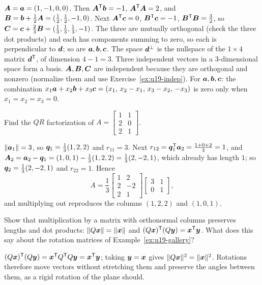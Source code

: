 \begin{solution}
$\boldsymbol{A}=\boldsymbol{a}=(1,-1,0,0)$. Then $\boldsymbol{A}^{\mathsf{T}}\boldsymbol{b}=-1$, $\boldsymbol{A}^{\mathsf{T}}\boldsymbol{A}=2$, and
$\boldsymbol{B}=\boldsymbol{b}+\frac12\boldsymbol{A}=(\frac12,\frac12,-1,0)$. Next $\boldsymbol{A}^{\mathsf{T}}\boldsymbol{c}=0$,
$\boldsymbol{B}^{\mathsf{T}}\boldsymbol{c}=-1$, $\boldsymbol{B}^{\mathsf{T}}\boldsymbol{B}=\frac32$, so
$\boldsymbol{C}=\boldsymbol{c}+\frac23\boldsymbol{B}=(\frac13,\frac13,\frac13,-1)$. The three are mutually orthogonal
(check the three dot products) and each has components summing to zero, so each is
perpendicular to $\boldsymbol{d}$; so are $\boldsymbol{a},\boldsymbol{b},\boldsymbol{c}$. The space $\boldsymbol{d}^{\perp}$ is the
nullspace of the $1\times 4$ matrix $\boldsymbol{d}^{\mathsf{T}}$, of dimension $4-1=3$. Three independent
vectors in a $3$-dimensional space form a basis. $\boldsymbol{A},\boldsymbol{B},\boldsymbol{C}$ are independent
because they are orthogonal and nonzero (normalize them and use Exercise~\ref{ex:u19-indep}).
For $\boldsymbol{a},\boldsymbol{b},\boldsymbol{c}$: the combination
$x_1\boldsymbol{a}+x_2\boldsymbol{b}+x_3\boldsymbol{c}=(x_1,\,x_2-x_1,\,x_3-x_2,\,-x_3)$ is zero only when
$x_1=x_2=x_3=0$.
\end{solution}

\begin{exercise}\label{ex:u19-qr}
Find the $QR$ factorization of $A=\begin{bmatrix}1&1\\2&0\\2&1\end{bmatrix}$.
\end{exercise}

\begin{solution}
$\|\boldsymbol{a}_1\|=3$, so $\boldsymbol{q}_1=\frac13(1,2,2)$ and $r_{11}=3$. Next
$r_{12}=\boldsymbol{q}_1^{\mathsf{T}}\boldsymbol{a}_2=\frac{1+0+2}{3}=1$, and
$\boldsymbol{A}_2=\boldsymbol{a}_2-\boldsymbol{q}_1=(1,0,1)-\frac13(1,2,2)=\frac13(2,-2,1)$, which already has length
$1$; so $\boldsymbol{q}_2=\frac13(2,-2,1)$ and $r_{22}=1$. Hence
\[
  A=\frac13\begin{bmatrix}1&2\\2&-2\\2&1\end{bmatrix}\begin{bmatrix}3&1\\0&1\end{bmatrix},
\]
and multiplying out reproduces the columns $(1,2,2)$ and $(1,0,1)$.
\end{solution}

\begin{exercise}\label{ex:u19-length}
Show that multiplication by a matrix with orthonormal columns preserves lengths and dot
products: $\|Q\boldsymbol{x}\|=\|\boldsymbol{x}\|$ and $(Q\boldsymbol{x})^{\mathsf{T}}(Q\boldsymbol{y})=\boldsymbol{x}^{\mathsf{T}}\boldsymbol{y}$. What does this
say about the rotation matrices of Example~\ref{ex:u19-gallery}?
\end{exercise}

\begin{solution}
$(Q\boldsymbol{x})^{\mathsf{T}}(Q\boldsymbol{y})=\boldsymbol{x}^{\mathsf{T}} Q^{\mathsf{T}} Q\boldsymbol{y}=\boldsymbol{x}^{\mathsf{T}}\boldsymbol{y}$; taking $\boldsymbol{y}=\boldsymbol{x}$ gives
$\|Q\boldsymbol{x}\|^2=\|\boldsymbol{x}\|^2$. Rotations therefore move vectors without stretching them and
preserve the angles between them, as a rigid rotation of the plane should.
\end{solution}
